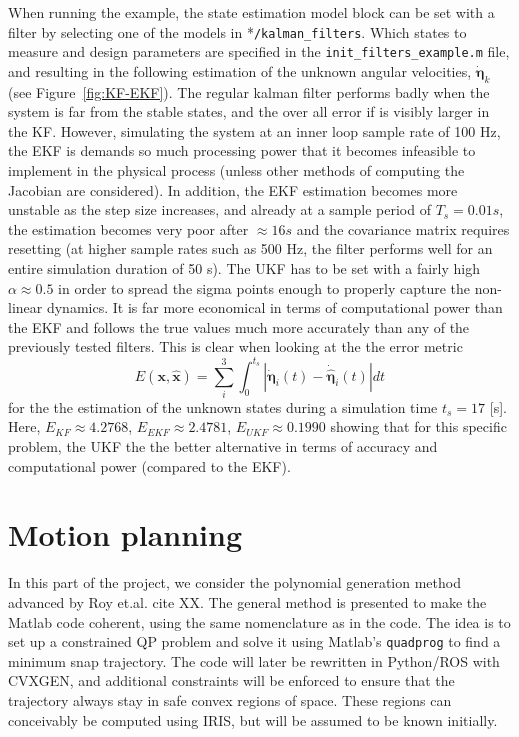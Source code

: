 \documentclass{article}
\begin{document}
When running the example, the state estimation model block can be set with a filter by selecting one of the models in *\texttt{/kalman\_filters}. Which states to measure and design parameters are specified in the \texttt{init\_filters\_example.m} file, and resulting in the following estimation of the unknown angular velocities, $\dot{\boldsymbol\eta}_k$  (see Figure~\ref{fig:KF-EKF}). The regular kalman filter performs badly when the system is far from the stable states, and the over all error if is visibly larger in the KF. However, simulating the system at an inner loop sample rate of 100 Hz, the EKF is demands so much processing power that it becomes infeasible to implement in the physical process (unless other methods of computing the Jacobian are considered). In addition, the EKF estimation becomes more unstable as the step size increases, and already at a sample period of $T_s = 0.01 s$, the estimation becomes very poor after $\approx 16 s$ and the covariance matrix requires resetting (at higher sample rates such as 500 Hz, the filter performs well for an entire simulation duration of 50 s). The UKF has to be set with a fairly high $\alpha\approx0.5$ in order to spread the sigma points enough to properly capture the non-linear dynamics. It is far more economical in terms of computational power than the EKF and follows the true values much more accurately than any of the previously tested filters. This is clear when looking at the the error metric 
\begin{equation}
E(\mathbf{x},\hat{\mathbf{x}}) = \sum^{3}_i\int_0^{t_s} |\dot{\boldsymbol{\eta}}_i(t) - \dot{\hat{\boldsymbol{\eta}}}_i(t)|dt
\end{equation}
for the the estimation of the unknown states during a simulation time $t_s = 17$ [s]. Here, $E_{KF} \approx 4.2768$, $E_{EKF} \approx2.4781$, $E_{UKF} \approx0.1990$ showing that for this specific problem, the UKF the the better alternative in terms of accuracy and computational power (compared to the EKF).
 
\section{Motion planning}\label{sec:reftraj}
In this part of the project, we consider the polynomial generation method advanced by Roy et.al. cite XX. The general method is presented to make the Matlab code coherent, using the same nomenclature as in the code. The idea is to set up a constrained QP problem and solve it using Matlab's \texttt{quadprog} to find a minimum snap trajectory. The code will later be rewritten in Python/ROS with CVXGEN, and additional constraints will be enforced to ensure that the trajectory always stay in safe convex regions of space. These regions can conceivably be computed using IRIS, but will be assumed to be known initially.
\end{document}
